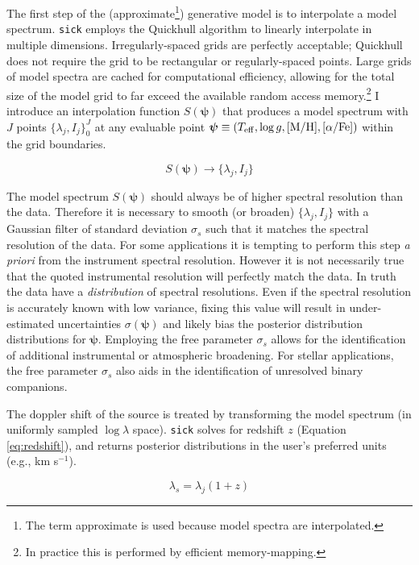 \documentclass[iop]{emulateapj}
\newcommand{\sick}{\texttt{sick}}
\begin{document}
The first step of the (approximate\footnote{The term approximate is used because 
model spectra are interpolated.}) generative model is to interpolate a model 
spectrum. \sick{} employs the Quickhull algorithm \citep{quickhull} to linearly 
interpolate in multiple dimensions. Irregularly-spaced grids are perfectly 
acceptable; Quickhull does not require the grid to be rectangular or 
regularly-spaced points. Large grids of model spectra are cached for 
computational efficiency, allowing for the total size of the model grid to far 
exceed the available random access memory.\footnote{In practice this is performed 
by efficient memory-mapping.} I introduce an interpolation function $S(\bm{\psi})$ 
that produces a model spectrum with $J$ points $\{\lambda_j,I_j\}_{0}^{J}$ at 
any evaluable point $\bm{\psi} \equiv (T_{\rm eff},\log{g},{\rm [M/H]},[\alpha/{\rm Fe}])$ 
within the grid boundaries.

\begin{equation}
S(\bm{\psi}) \rightarrow \{\lambda_j,I_j\}
\end{equation}

The model spectrum $S(\bm{\psi})$ should always be of higher spectral resolution 
than the data. Therefore it is necessary to smooth (or broaden) $\{\lambda_j,I_j\}$ 
with a Gaussian filter of standard deviation $\sigma_{s}$ such that it matches 
the spectral resolution of the data. For some applications it is tempting to 
perform this step \textit{a priori} from the instrument spectral resolution. 
However it is not necessarily true that the quoted instrumental resolution will 
perfectly match the data. In truth the data have a \textit{distribution} of 
spectral resolutions. Even if the spectral resolution is accurately known with 
low variance, fixing this value will result in under-estimated uncertainties 
$\sigma(\bm{\psi})$ and likely bias the posterior distribution distributions for 
$\bm{\psi}$. Employing the free parameter $\sigma_{s}$ allows for the 
identification of additional instrumental or atmospheric broadening. For stellar 
applications, the free parameter $\sigma_{s}$ also aids in the identification of 
unresolved binary companions.

The doppler shift of the source is treated by transforming the model spectrum 
(in uniformly sampled $\log\lambda$ space). \sick{} solves for redshift $z$ 
(Equation \ref{eq:redshift}), and returns posterior distributions in the user's 
preferred units (e.g., km s$^{-1}$).

\begin{equation}
\label{eq:redshift}
\lambda_{s} = \lambda_{j}(1 + z)
\end{equation}
\end{document}
